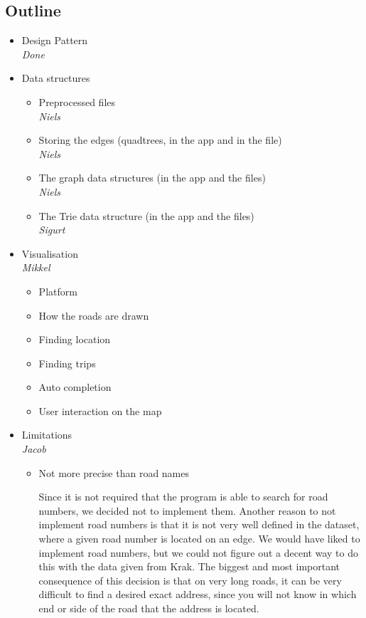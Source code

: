 \documentclass[a4paper,11pt]{article}
\begin{document}
\subsection{Outline}
\begin{itemize}
	\item Design Pattern \\
		\textsl{Done}
	\item Data structures
	\begin{itemize}
		\item Preprocessed files \\
		\textsl{Niels}
		\item Storing the edges (quadtrees, in the app and in the file) \\
		\textsl{Niels}
		\item The graph data structures (in the app and the files) \\
		\textsl{Niels}
		\item The Trie data structure (in the app and the files) \\
		\textsl{Sigurt}
	\end{itemize}
	\item Visualisation \\
		\textsl{Mikkel}
	\begin{itemize}
		\item Platform
		\item How the roads are drawn
		\item Finding location
		\item Finding trips
		\item Auto completion
		\item User interaction on the map
	\end{itemize}
	\item Limitations \\
		\textsl{Jacob}
	\begin{itemize}
		\item Not more precise than road names
		    
		    Since it is not required that the program is able to search for road numbers, we decided not to implement them. Another reason to not implement road numbers is that it is not very well defined in the dataset, where a given road number is located on an edge. We would have liked to implement road numbers, but we could not figure out a decent way to do this with the data given from Krak. The biggest and most important consequence of this decision is that on very long roads, it can be very difficult to find a desired exact address, since you will not know in which end or side of the road that the address is located.   


\end{itemize}
\end{itemize}
\end{document}
